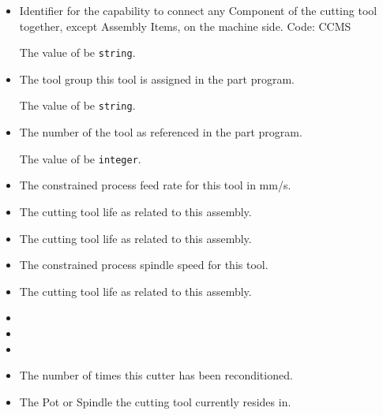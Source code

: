\begin{itemize}

\item {} \newline Identifier for the capability to connect any Component of the cutting tool together, except Assembly Items, on the machine side. Code: CCMS

The value of  \MUST be \texttt{string}.

\item {} \newline The tool group this tool is assigned in the part program.

The value of  \MUST be \texttt{string}.

\item {} \newline The number of the tool as referenced in the part program.

The value of  \MUST be \texttt{integer}.

\item {} \newline The constrained process feed rate for this tool in mm/s.

\item {} \newline The cutting tool life as related to this assembly.

\item {} \newline The cutting tool life as related to this assembly.

\item {} \newline The constrained process spindle speed for this tool.


\item {} \newline The cutting tool life as related to this assembly.

\item {} \newline 

\item {} \newline 

\item {} \newline 

\item {} \newline The number of times this cutter has been reconditioned.


\item {} \newline The Pot or Spindle the cutting tool currently resides in.
\end{itemize}


